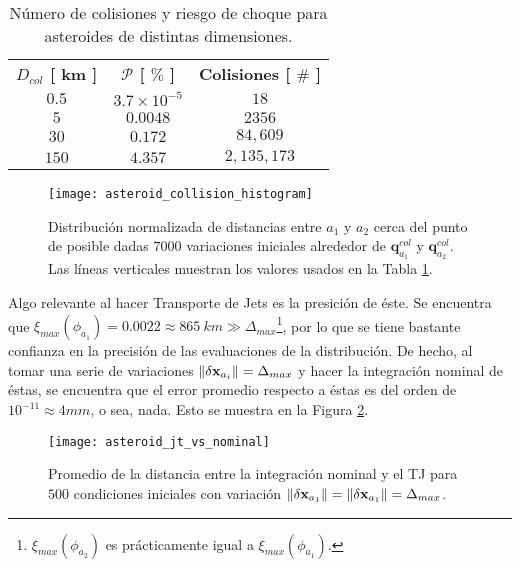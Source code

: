 \begin{table}[h!]
\centering
\begin{tabular}{c|c|c}
\toprule
\textbf{$ D_{col}$ [ km ]} & \textbf{$\mathcal{P}$ [ $\%$ ]} & \textbf{Colisiones [ $ \# $ ]} \\ \cmidrule(l){1-3} 
\textbf{$0.5$} &   $3.7 \times 10^{-5}$   & $18$          \\
\textbf{$5$}   &   $0.0048$               & $2356$        \\
\textbf{$30$}  &   $0.172$                & $84,609$     \\
\textbf{$150$} &   $4.357$                & $2,135,173$   \\ \bottomrule 
\end{tabular}
\caption{Número de colisiones y riesgo de choque para asteroides de distintas dimensiones.}
\label{table:collision_table}
\end{table}

\begin{figure}
 \centering
 \texttt{[image: asteroid\_collision\_histogram]}
 \caption{Distribución normalizada de distancias entre $a_1$ y $a_2$ cerca del punto de posible dadas $7000$ variaciones iniciales alrededor de $\mathbf{q}_{a_1}^{col}$ y $\mathbf{q}_{a_2}^{col}$. Las líneas verticales muestran los valores usados en la Tabla \ref{table:collision_table}.}
 \label{fig:asteroid_collision_histogram}
\end{figure}


Algo relevante al hacer Transporte de Jets es la presición de éste. Se encuentra que $\xi_{max}(\phi_{a_1}) = 0.0022 \approx 865 \ km \gg \Delta_{max}$\footnote{$\xi_{max}(\phi_{a_2})$ es prácticamente igual a $\xi_{max}(\phi_{a_1})$.}, por lo que se tiene bastante confianza en la precisión de las evaluaciones de la distribución. De hecho, al tomar una serie de variaciones $\left\lVert\delta\mathbf{x}_{a_i}\right\rVert = \Delta_{max}$ y hacer la integración nominal de éstas, se encuentra que el error promedio respecto a éstas es del orden de $10^{-11} \approx 4 mm$, o sea, nada. Esto se muestra en la Figura \ref{fig:asteroid_jt_vs_nominal}.

\begin{figure}
 \centering
 \texttt{[image: asteroid\_jt\_vs\_nominal]}
 \caption{Promedio de la distancia entre la integración nominal y el TJ para $500$ condiciones iniciales con variación $\left\lVert\delta\mathbf{x}_{a_1}\right\rVert = \left\lVert\delta\mathbf{x}_{a_1}\right\rVert = \Delta_{max}$.}
 \label{fig:asteroid_jt_vs_nominal}
\end{figure}

